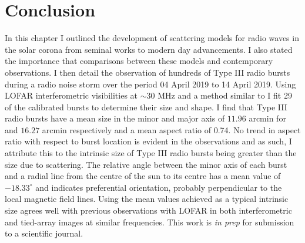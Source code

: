 \section{Conclusion}
In this chapter I outlined the development of scattering models for radio waves in the solar corona from seminal works to modern day advancements. I also stated the importance that comparisons between these models and contemporary observations. I then detail the observation of hundreds of Type III radio bursts during a radio noise storm over the period 04 April 2019 to 14 April 2019. Using LOFAR interferometric visibilities at $\sim 30$ MHz and a method similar to \cite{Murphy2021} I fit 29 of the calibrated bursts to determine their size and shape. I find that Type III radio bursts have a mean size in the minor and major axis of $11.96$ arcmin for and $16.27$ arcmin respectively and a mean aspect ratio of 0.74. No trend in aspect ratio with respect to burst location is evident in the observations and as such, I attribute this to the intrinsic size of Type III radio bursts being greater than the size due to scattering. The relative angle between the minor axis of each burst and a radial line from the centre of the sun to its centre has a mean value of $-18.33^\circ$ and indicates preferential orientation, probably perpendicular to the local magnetic field lines. Using the mean values achieved as a typical intrinsic size agrees well with previous observations with LOFAR in both interferometric and tied-array images at similar frequencies. This work is \textit{in prep} for submission to a scientific journal.
